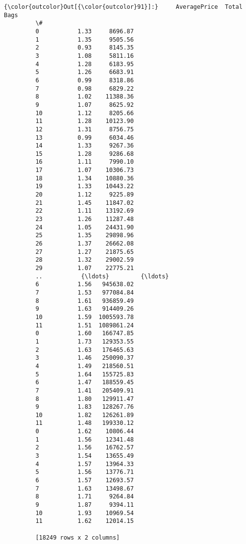 \documentclass[11pt]{article}
\begin{document}
\begin{Verbatim}[commandchars=\\\{\}]
{\color{outcolor}Out[{\color{outcolor}91}]:}     AveragePrice  Total Bags
         \#                           
         0           1.33     8696.87
         1           1.35     9505.56
         2           0.93     8145.35
         3           1.08     5811.16
         4           1.28     6183.95
         5           1.26     6683.91
         6           0.99     8318.86
         7           0.98     6829.22
         8           1.02    11388.36
         9           1.07     8625.92
         10          1.12     8205.66
         11          1.28    10123.90
         12          1.31     8756.75
         13          0.99     6034.46
         14          1.33     9267.36
         15          1.28     9286.68
         16          1.11     7990.10
         17          1.07    10306.73
         18          1.34    10880.36
         19          1.33    10443.22
         20          1.12     9225.89
         21          1.45    11847.02
         22          1.11    13192.69
         23          1.26    11287.48
         24          1.05    24431.90
         25          1.35    29898.96
         26          1.37    26662.08
         27          1.27    21875.65
         28          1.32    29002.59
         29          1.07    22775.21
         ..           {\ldots}         {\ldots}
         6           1.56   945638.02
         7           1.53   977084.84
         8           1.61   936859.49
         9           1.63   914409.26
         10          1.59  1005593.78
         11          1.51  1089861.24
         0           1.60   166747.85
         1           1.73   129353.55
         2           1.63   176465.63
         3           1.46   250090.37
         4           1.49   218560.51
         5           1.64   155725.83
         6           1.47   188559.45
         7           1.41   205409.91
         8           1.80   129911.47
         9           1.83   128267.76
         10          1.82   126261.89
         11          1.48   199330.12
         0           1.62    10806.44
         1           1.56    12341.48
         2           1.56    16762.57
         3           1.54    13655.49
         4           1.57    13964.33
         5           1.56    13776.71
         6           1.57    12693.57
         7           1.63    13498.67
         8           1.71     9264.84
         9           1.87     9394.11
         10          1.93    10969.54
         11          1.62    12014.15
         
         [18249 rows x 2 columns]
\end{Verbatim}
            
\end{document}
